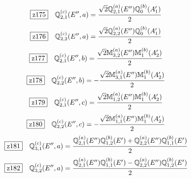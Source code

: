 \documentclass[fleqn,10pt,landscape]{jsarticle}
\begin{document}
\begin{dmath*}
\hspace*{3mm}\fbox{z175}\quad \mathbb{Q}_{2,1}^{(c)}(E^{\prime\prime},a)=\frac{\sqrt{2} \mathbb{Q}_{2,1}^{(a)}(E^{\prime\prime}) \mathbb{Q}_{0}^{(b)}(A_{1}^{\prime})}{2}
\end{dmath*}
\begin{dmath*}
\hspace*{3mm}\fbox{z176}\quad \mathbb{Q}_{2,2}^{(c)}(E^{\prime\prime},a)=\frac{\sqrt{2} \mathbb{Q}_{2,2}^{(a)}(E^{\prime\prime}) \mathbb{Q}_{0}^{(b)}(A_{1}^{\prime})}{2}
\end{dmath*}
\begin{dmath*}
\hspace*{3mm}\fbox{z177}\quad \mathbb{Q}_{2,1}^{(c)}(E^{\prime\prime},b)=\frac{\sqrt{2} \mathbb{M}_{3,2}^{(a)}(E^{\prime\prime}) \mathbb{M}_{1}^{(b)}(A_{2}^{\prime})}{2}
\end{dmath*}
\begin{dmath*}
\hspace*{3mm}\fbox{z178}\quad \mathbb{Q}_{2,2}^{(c)}(E^{\prime\prime},b)=- \frac{\sqrt{2} \mathbb{M}_{3,1}^{(a)}(E^{\prime\prime}) \mathbb{M}_{1}^{(b)}(A_{2}^{\prime})}{2}
\end{dmath*}
\begin{dmath*}
\hspace*{3mm}\fbox{z179}\quad \mathbb{Q}_{2,1}^{(c)}(E^{\prime\prime},c)=\frac{\sqrt{2} \mathbb{M}_{1,2}^{(a)}(E^{\prime\prime}) \mathbb{M}_{1}^{(b)}(A_{2}^{\prime})}{2}
\end{dmath*}
\begin{dmath*}
\hspace*{3mm}\fbox{z180}\quad \mathbb{Q}_{2,2}^{(c)}(E^{\prime\prime},c)=- \frac{\sqrt{2} \mathbb{M}_{1,1}^{(a)}(E^{\prime\prime}) \mathbb{M}_{1}^{(b)}(A_{2}^{\prime})}{2}
\end{dmath*}
\begin{dmath*}
\hspace*{3mm}\fbox{z181}\quad \mathbb{Q}_{3,1}^{(c)}(E^{\prime\prime},a)=\frac{\mathbb{Q}_{2,1}^{(a)}(E^{\prime\prime}) \mathbb{Q}_{1,2}^{(b)}(E^{\prime}) + \mathbb{Q}_{2,2}^{(a)}(E^{\prime\prime}) \mathbb{Q}_{1,1}^{(b)}(E^{\prime})}{2}
\end{dmath*}
\begin{dmath*}
\hspace*{3mm}\fbox{z182}\quad \mathbb{Q}_{3,2}^{(c)}(E^{\prime\prime},a)=\frac{\mathbb{Q}_{2,1}^{(a)}(E^{\prime\prime}) \mathbb{Q}_{1,1}^{(b)}(E^{\prime}) - \mathbb{Q}_{2,2}^{(a)}(E^{\prime\prime}) \mathbb{Q}_{1,2}^{(b)}(E^{\prime})}{2}
\end{dmath*}
\end{document}
